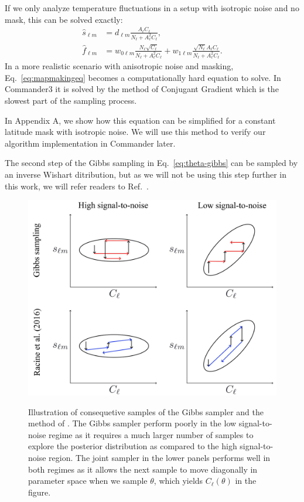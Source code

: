\documentclass[twocolumn]{../common/aa}
\begin{document}
If we only analyze temperature fluctuations in a setup with isotropic noise and no mask, this can be solved exactly:
\begin{align}
    \hat{s}_{\ell m} &= d_{\ell m}\frac{A_{\ell}C_{\ell}}{N_\ell + A_{\ell}^2C_{\ell}},\\
    \hat{f}_{\ell m} &= w_{0\ell m}\frac{N_{\ell}\sqrt{C_{\ell}}}{N_\ell + A_{\ell}^2C_{\ell}}+w_{1\ell m}\frac{\sqrt{N_{\ell}}A_{\ell}C_\ell}{N_\ell + A_{\ell}^2C_{\ell}}.
\end{align}
In a more realistic scenario with anisotropic noise and masking, Eq.~\eqref{eq:mapmakingeq} becomes a computationally hard equation to solve. In Commander3 it is solved by the method of Conjugant Gradient which is the slowest part of the sampling process.

In Appendix A, we show how this equation can be simplified for a constant latitude mask with isotropic noise. We will use this method to verify our algorithm implementation in Commander later.

The second step of the Gibbs sampling in Eq.~\eqref{eq:theta-gibbs} can be sampled by an inverse Wishart ditribution, but as we will not be using this step further in this work, we will refer readers to Ref.~\cite{}.

\begin{figure}
	\centering
	\includegraphics[width=\linewidth]{figures/parameter-estimation.jpg}
    \label{fig:illustration}
	\caption{Illustration of consequetive samples of the Gibbs sampler and the method of \cite{racine:2016}. The Gibbs sampler perform poorly in the low signal-to-noise regime as it requires a much larger number of samples to explore the posterior distribution as compared to the high signal-to-noise region. The joint sampler in the lower panels performs well in both regimes as it allows the next sample to move diagonally in parameter space when we sample $\theta$, which yields $C_\ell(\theta)$ in the figure.}
\end{figure}
\end{document}
